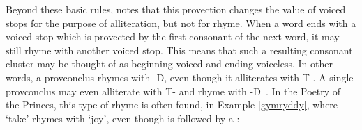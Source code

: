Beyond these basic rules, \textcite{morris-jones_cerdd_1925} notes that this provection changes the value of voiced stops for the purpose of alliteration, but not for rhyme.
When a word ends with a voiced stop which is provected by the first consonant of the next word, it may still rhyme with another voiced stop. This means that such a resulting consonant cluster may be thought of as beginning voiced and ending voiceless. In other words, a \gls{provconclus} rhymes with -\gls{D}, even though it alliterates with \gls{T}-. A single \gls{provconclus} may even alliterate with \gls{T}- and rhyme with -\gls{D}~\autocite[\S 391]{morris-jones_cerdd_1925}. 
In the Poetry of the Princes, this type of rhyme is often found, \eg in Example \ref{gymryddy}, where  `take' rhymes with  `joy', even though  is followed by a :     

